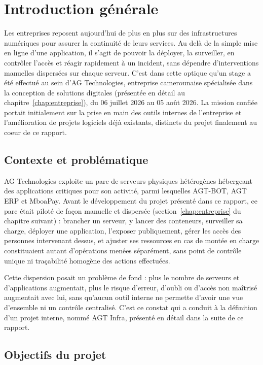 \chapter*{Introduction générale}

Les entreprises reposent aujourd'hui de plus en plus sur des infrastructures
numériques pour assurer la continuité de leurs services. Au delà de la
simple mise en ligne d'une application, il s'agit de pouvoir la déployer,
la surveiller, en contrôler l'accès et réagir rapidement à un incident,
sans dépendre d'interventions manuelles dispersées sur chaque serveur.
C'est dans cette optique qu'un stage a été effectué au sein d'AG
Technologies, entreprise camerounaise spécialisée dans la conception de
solutions digitales (présentée en détail au chapitre~\ref{chap:entreprise}),
du 06 juillet 2026 au 05 août 2026. La mission confiée portait initialement
sur la prise en main des outils internes de l'entreprise et l'amélioration
de projets logiciels déjà existants, distincts du projet finalement au
coeur de ce rapport.

\section*{Contexte et problématique}

AG Technologies exploite un parc de serveurs physiques hétérogènes
hébergeant des applications critiques pour son activité, parmi lesquelles
AGT-BOT, AGT ERP et MboaPay. Avant le développement du projet présenté
dans ce rapport, ce parc était piloté de façon manuelle et dispersée
(section~\ref{chap:entreprise} du chapitre suivant) : brancher un serveur,
y lancer des conteneurs, surveiller sa charge, déployer une application,
l'exposer publiquement, gérer les accès des personnes intervenant dessus,
et ajuster ses ressources en cas de montée en charge constituaient autant
d'opérations menées séparément, sans point de contrôle unique ni
traçabilité homogène des actions effectuées.

Cette dispersion posait un problème de fond : plus le nombre de serveurs
et d'applications augmentait, plus le risque d'erreur, d'oubli ou d'accès
non maîtrisé augmentait avec lui, sans qu'aucun outil interne ne permette
d'avoir une vue d'ensemble ni un contrôle centralisé. C'est ce constat qui
a conduit à la définition d'un projet interne, nommé AGT Infra, présenté
en détail dans la suite de ce rapport.

\section*{Objectifs du projet}

